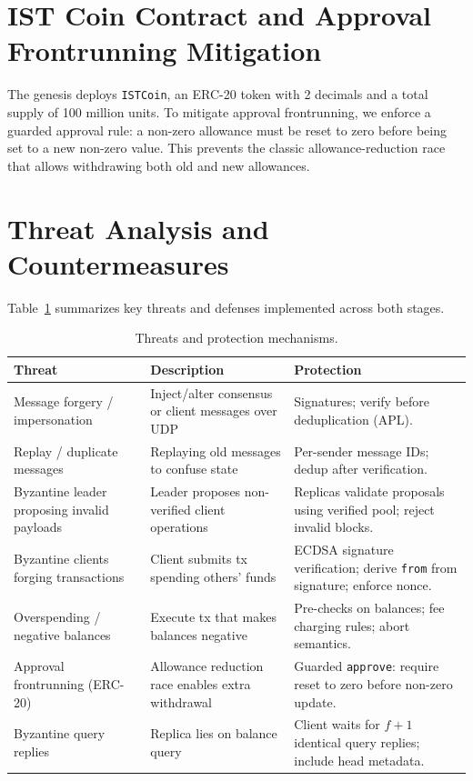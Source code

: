 \documentclass[runningheads]{llncs}
\begin{document}
\section{IST Coin Contract and Approval Frontrunning Mitigation}
The genesis deploys \texttt{ISTCoin}, an ERC-20 token with 2 decimals and a total supply of 100 million units.
To mitigate approval frontrunning, we enforce a guarded approval rule: a non-zero allowance must be reset to zero before being set to a new non-zero value.
This prevents the classic allowance-reduction race that allows withdrawing both old and new allowances.

\section{Threat Analysis and Countermeasures}
Table~\ref{tab:threats} summarizes key threats and defenses implemented across both stages.

\begin{table}[t]
\caption{Threats and protection mechanisms.}
\label{tab:threats}
\centering
\begin{tabularx}{\textwidth}{@{}lX X@{}}
\toprule
\textbf{Threat} & \textbf{Description} & \textbf{Protection} \\
\midrule
Message forgery / impersonation & Inject/alter consensus or client messages over UDP & Signatures; verify before deduplication (APL). \\
Replay / duplicate messages & Replaying old messages to confuse state & Per-sender message IDs; dedup after verification. \\
Byzantine leader proposing invalid payloads & Leader proposes non-verified client operations & Replicas validate proposals using verified pool; reject invalid blocks. \\
Byzantine clients forging transactions & Client submits tx spending others' funds & ECDSA signature verification; derive \texttt{from} from signature; enforce nonce. \\
Overspending / negative balances & Execute tx that makes balances negative & Pre-checks on balances; fee charging rules; abort semantics. \\
Approval frontrunning (ERC-20) & Allowance reduction race enables extra withdrawal & Guarded \texttt{approve}: require reset to zero before non-zero update. \\
Byzantine query replies & Replica lies on balance query & Client waits for $f{+}1$ identical query replies; include head metadata. \\
\bottomrule
\end{tabularx}
\end{table}
\end{document}

